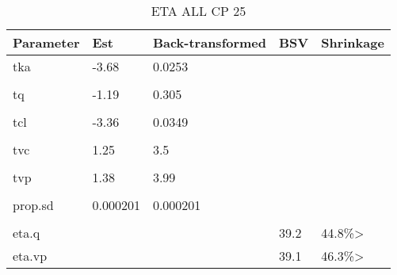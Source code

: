 \begin{table}
\centering\centering
\caption{ETA ALL CP 25}
\centering
\fontsize{8}{10}\selectfont
\begin{tabular}[t]{lllll}
\toprule
\textbf{Parameter} & \textbf{Est} & \textbf{Back-transformed} & \textbf{BSV} & \textbf{Shrinkage}\\
\midrule
tka & -3.68 & 0.0253 &  & \\
\midrule\\
tq & -1.19 & 0.305 &  & \\
\midrule\\
tcl & -3.36 & 0.0349 &  & \\
\midrule\\
tvc & 1.25 & 3.5 &  & \\
\midrule\\
tvp & 1.38 & 3.99 &  & \\
\midrule\\
prop.sd & 0.000201 & 0.000201 &  & \\
\midrule\\
eta.q &  &  & 39.2 & 44.8\%>\\
\midrule
eta.vp &  &  & 39.1 & 46.3\%>\\
\bottomrule
\end{tabular}
\end{table}